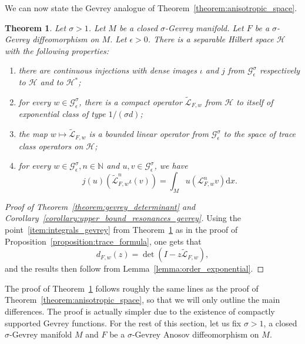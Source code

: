 \documentclass[10pt]{amsart}
\newtheorem{theo}{Theorem}[section]
\theoremstyle{definition}\newtheorem{defi}[theo]{Definition}\newtheorem{rema}[theo]{Remark}\newtheorem{exam}[theo]{Example}\newtheorem{exem}[theo]{Example}\newtheorem{nota}[theo]{Notation}
\newcommand{\p}[1]{\left(#1\right)}
\newcommand{\clL}{\mathcal{L}}
\newcommand{\clH}{\mathcal{H}}
\newcommand{\clG}{\mathcal{G}}
\newcommand{\bbN}{\mathbb{N}}
\newcommand{\rmd}{\mathrm{d}}
\newcommand*{\romanenumi}{\renewcommand*{\theenumi}{\roman{enumi}}}
\begin{document}
We can now state the Gevrey analogue of Theorem~\ref{theorem:anisotropic_space}.

\begin{theo}\label{theorem:anisotropic_space_gevrey}
Let $\sigma > 1$. Let $M$ be a closed $\sigma$-Gevrey manifold. Let $F$ be a $\sigma$-Gevrey diffeomorphism on $M$. Let $\epsilon > 0$. There is a separable Hilbert space $\clH$ with the following properties:
\begin{enumerate}\romanenumi
\item\label{item:injections_gevrey} there are continuous injections with dense images $\iota$ and $j$ from $\clG^\sigma_\epsilon$ respectively to $\clH$ and to $\clH^*$; 
\item\label{item:extension_operator_gevrey} for every $w \in \clG^\sigma_\epsilon$, there is a compact operator $\widetilde{\clL}_{F,w}$ from $\clH$ to itself of exponential class of type $1/(\sigma d)$; 
\item\label{item:holomorphic_family_gevrey} the map $w \mapsto \widetilde{\clL}_{F,w}$ is a bounded linear operator from $\clG^\sigma_\epsilon$ to the space of trace class operators on $\clH$; 
\item\label{item:integrals_gevrey} for every $w \in \clG^\sigma_\epsilon, n \in \bbN$ and $u,v \in \clG^\sigma_\epsilon$, we have
\begin{equation*}
j(u)\p{\widetilde{\clL}^n_{F,w} \iota(v)} = \int_M u \p{\clL_{F,w}^n v} \rmd x.
\end{equation*}
\end{enumerate}
\end{theo}

\begin{proof}[Proof of Theorem~\ref{theorem:gevrey_determinant} and Corollary~\ref{corollary:upper_bound_resonances_gevrey}]
Using the point~\eqref{item:integrals_gevrey} from Theorem~\ref{theorem:anisotropic_space_gevrey} as in the proof of Proposition~\ref{proposition:trace_formula}, one gets that
\begin{equation*}
d_{F,w}(z) = \det(I - z\widetilde{\clL}_{F,w}),
\end{equation*}
and the results then follow from Lemma~\ref{lemma:order_exponential}.
\end{proof}

The proof of Theorem~\ref{theorem:anisotropic_space_gevrey} follows roughly the same lines as the proof of Theorem~\ref{theorem:anisotropic_space}, so that we will only outline the main differences. The proof is actually simpler due to the existence of compactly supported Gevrey functions. For the rest of this section, let us fix $\sigma > 1$, a closed $\sigma$-Gevrey manifold $M$ and $F$ be a $\sigma$-Gevrey Anosov diffeomorphism on $M$.
\end{document}
